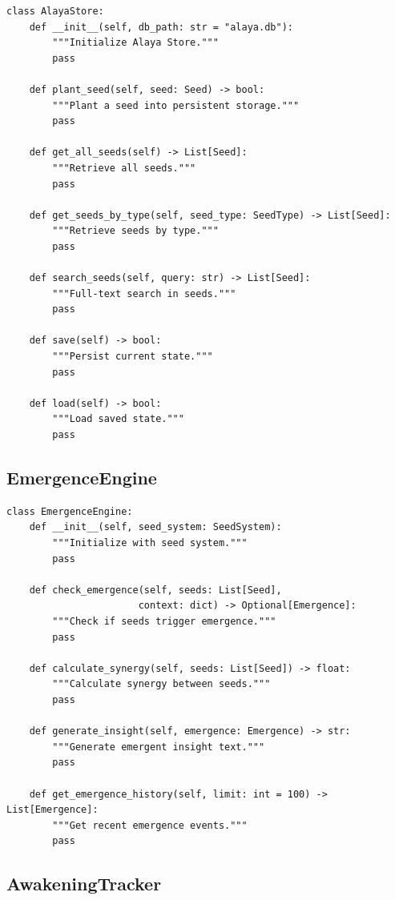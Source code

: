 \documentclass[11pt, a4paper]{article}
\begin{document}
\begin{lstlisting}[style=python, caption={AlayaStore API}]
class AlayaStore:
    def __init__(self, db_path: str = "alaya.db"):
        """Initialize Alaya Store."""
        pass
    
    def plant_seed(self, seed: Seed) -> bool:
        """Plant a seed into persistent storage."""
        pass
    
    def get_all_seeds(self) -> List[Seed]:
        """Retrieve all seeds."""
        pass
    
    def get_seeds_by_type(self, seed_type: SeedType) -> List[Seed]:
        """Retrieve seeds by type."""
        pass
    
    def search_seeds(self, query: str) -> List[Seed]:
        """Full-text search in seeds."""
        pass
    
    def save(self) -> bool:
        """Persist current state."""
        pass
    
    def load(self) -> bool:
        """Load saved state."""
        pass
\end{lstlisting}

\subsection{EmergenceEngine}

\begin{lstlisting}[style=python, caption={EmergenceEngine API}]
class EmergenceEngine:
    def __init__(self, seed_system: SeedSystem):
        """Initialize with seed system."""
        pass
    
    def check_emergence(self, seeds: List[Seed], 
                       context: dict) -> Optional[Emergence]:
        """Check if seeds trigger emergence."""
        pass
    
    def calculate_synergy(self, seeds: List[Seed]) -> float:
        """Calculate synergy between seeds."""
        pass
    
    def generate_insight(self, emergence: Emergence) -> str:
        """Generate emergent insight text."""
        pass
    
    def get_emergence_history(self, limit: int = 100) -> List[Emergence]:
        """Get recent emergence events."""
        pass
\end{lstlisting}

\subsection{AwakeningTracker}
\end{document}
